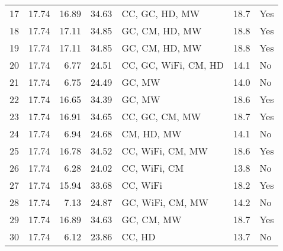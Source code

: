\begin{tabular}{lrrrlll}
17 &                17.74 &            16.89 &        34.63 &        CC, GC, HD, MW &                 18.7 &  Yes \\
18 &                17.74 &            17.11 &        34.85 &        GC, CM, HD, MW &                 18.8 &  Yes \\
19 &                17.74 &            17.11 &        34.85 &        GC, CM, HD, MW &                 18.8 &  Yes \\
20 &                17.74 &             6.77 &        24.51 &  CC, GC, WiFi, CM, HD &                 14.1 &   No \\
21 &                17.74 &             6.75 &        24.49 &                GC, MW &                 14.0 &   No \\
22 &                17.74 &            16.65 &        34.39 &                GC, MW &                 18.6 &  Yes \\
23 &                17.74 &            16.91 &        34.65 &        CC, GC, CM, MW &                 18.7 &  Yes \\
24 &                17.74 &             6.94 &        24.68 &            CM, HD, MW &                 14.1 &   No \\
25 &                17.74 &            16.78 &        34.52 &      CC, WiFi, CM, MW &                 18.6 &  Yes \\
26 &                17.74 &             6.28 &        24.02 &          CC, WiFi, CM &                 13.8 &   No \\
27 &                17.74 &            15.94 &        33.68 &              CC, WiFi &                 18.2 &  Yes \\
28 &                17.74 &             7.13 &        24.87 &      GC, WiFi, CM, MW &                 14.2 &   No \\
29 &                17.74 &            16.89 &        34.63 &            GC, CM, MW &                 18.7 &  Yes \\
30 &                17.74 &             6.12 &        23.86 &                CC, HD &                 13.7 &   No \\
\bottomrule
\end{tabular}
